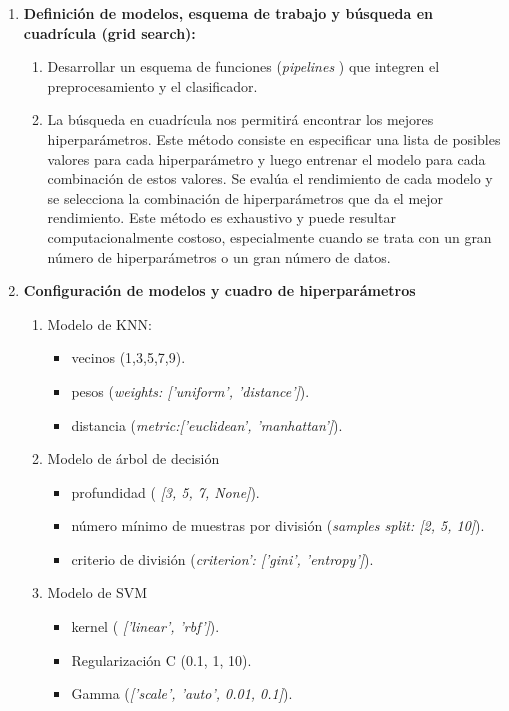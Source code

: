 \documentclass{article}
\begin{document}
\begin{enumerate}
\item \textbf{Definición de modelos, esquema de trabajo y búsqueda en cuadrícula (grid search):}
\begin{enumerate}
    \item Desarrollar un esquema de funciones (\textit{pipelines} ) que integren el preprocesamiento y el clasificador.
\item La búsqueda en cuadrícula nos permitirá encontrar los mejores hiperparámetros. Este método consiste en especificar una lista de posibles valores para cada hiperparámetro y luego entrenar el modelo para cada combinación de estos valores. Se evalúa el rendimiento de cada modelo y se selecciona la combinación de hiperparámetros que da el mejor rendimiento. Este método es exhaustivo y puede resultar computacionalmente costoso, especialmente cuando se trata con un gran número de hiperparámetros o un gran número de datos.
\end{enumerate}
    
  \item \textbf{Configuración de modelos y cuadro de hiperparámetros}
    \begin{enumerate}
      \item Modelo de KNN:
      \begin{itemize}
          \item vecinos (1,3,5,7,9).
          \item pesos (\textit{weights: ['uniform', 'distance']}).
          \item distancia (\textit{metric:['euclidean', 'manhattan']}).
      \end{itemize} 
      \item Modelo de árbol de decisión  
      \begin{itemize}
          \item profundidad ( \textit{[3, 5, 7, None]}).
          \item número mínimo de muestras por división (\textit{samples split: [2, 5, 10]}).
          \item criterio de división (\textit{criterion': ['gini', 'entropy']}).
      \end{itemize}

      \item Modelo de SVM  
      \begin{itemize}
          \item kernel ( \textit{['linear', 'rbf']}).
          \item Regularización C (0.1, 1, 10).
          \item Gamma (\textit{['scale', 'auto', 0.01, 0.1]}).
      \end{itemize}
  

\end{enumerate}
\end{enumerate}
\end{document}
